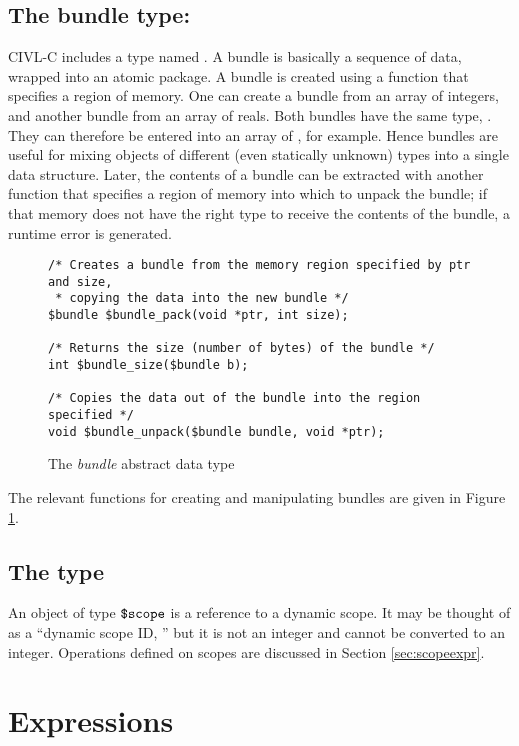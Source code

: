 \subsection{The bundle type: \cbundle}

CIVL-C includes a type named \cbundle. A bundle is basically a
sequence of data, wrapped into an atomic package. A bundle is created
using a function that specifies a region of memory. One can create a
bundle from an array of integers, and another bundle from an array of
reals. Both bundles have the same type, \cbundle. They can therefore
be entered into an array of \cbundle, for example. Hence bundles are
useful for mixing objects of different (even statically unknown) types
into a single data structure. Later, the contents of a bundle can be
extracted with another function that specifies a region of memory into
which to unpack the bundle; if that memory does not have the right
type to receive the contents of the bundle, a runtime error is
generated.

\begin{figure}
\begin{verbatim}
/* Creates a bundle from the memory region specified by ptr and size,
 * copying the data into the new bundle */
$bundle $bundle_pack(void *ptr, int size);

/* Returns the size (number of bytes) of the bundle */
int $bundle_size($bundle b);

/* Copies the data out of the bundle into the region specified */
void $bundle_unpack($bundle bundle, void *ptr);
\end{verbatim}
  \caption{The \emph{bundle} abstract data type}
  \label{fig:bundle}
\end{figure}

The relevant functions for creating and manipulating bundles
are given in Figure \ref{fig:bundle}.

\subsection{The \cscope{} type}
\label{sec:scopetype}

An object of type $\mbox{\texttt{\${}scope}}$ is a reference to a dynamic scope.  It may
be thought of as a ``dynamic scope ID, '' but it is not an integer and
cannot be converted to an integer.  Operations defined on scopes are
discussed in Section \ref{sec:scopeexpr}.

\section{Expressions}

